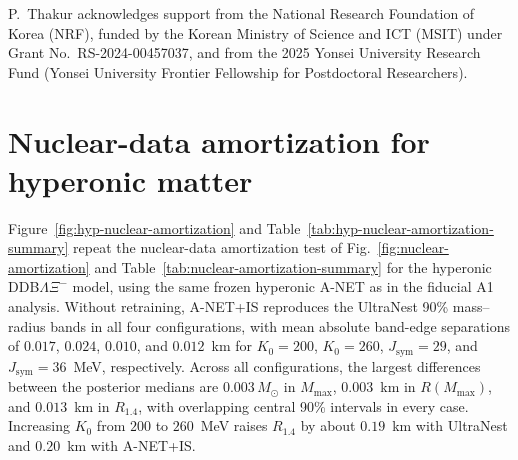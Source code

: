 \documentclass[aps,prd,twocolumn,superscriptaddress,nofootinbib,longbibliography]{revtex4-2}
\begin{document}
\vspace{-0.5em}
\begin{acknowledgments}
\vspace{-0.75em}
P.~Thakur acknowledges support from the National Research
Foundation of Korea (NRF), funded by the Korean Ministry of Science and ICT
(MSIT) under Grant
No.~RS-2024-00457037, and from the 2025 Yonsei University Research Fund
(Yonsei University Frontier Fellowship for Postdoctoral Researchers).
\end{acknowledgments}

\appendix

\section{Nuclear-data amortization for hyperonic matter}
\label{app:hyperonic-nuclear-amortization}

Figure~\ref{fig:hyp-nuclear-amortization} and
Table~\ref{tab:hyp-nuclear-amortization-summary} repeat the nuclear-data
amortization test of Fig.~\ref{fig:nuclear-amortization} and
Table~\ref{tab:nuclear-amortization-summary} for the hyperonic
DDB$\Lambda\Xi^-$ model, using the same frozen hyperonic A-NET as in the
fiducial A1 analysis. Without retraining, A-NET+IS
reproduces the UltraNest 90\% mass--radius bands in all four configurations,
with mean absolute band-edge separations of $0.017$, $0.024$, $0.010$, and
$0.012$~km for $K_0=200$, $K_0=260$, $J_{\mathrm{sym}}=29$, and
$J_{\mathrm{sym}}=36$~MeV, respectively. Across all configurations, the largest
differences between the posterior medians are $0.003\,M_\odot$ in $M_{\max}$,
$0.003$~km in $R(M_{\max})$, and $0.013$~km in $R_{1.4}$, with overlapping
central 90\% intervals in every case. Increasing $K_0$ from $200$ to
$260$~MeV raises $R_{1.4}$ by about $0.19$~km with UltraNest and $0.20$~km
with A-NET+IS.
\end{document}
